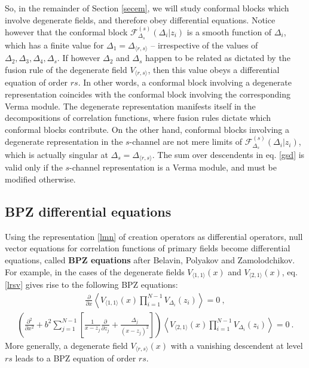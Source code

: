 \documentclass[12pt, a4paper, notitlepage, twoside]{report}
\numberwithin{equation}{section}
\theoremstyle{break}
\begin{document}
So, in the remainder of Section \ref{secem}, we will study conformal blocks which involve degenerate fields, and therefore obey differential equations. 
Notice however that the conformal block $\mathcal{F}^{(s)}_{\Delta_s}(\Delta_i|z_i)$ is a smooth function of $\Delta_i$, which has a finite value for $\Delta_1 = \Delta_{\langle r,s\rangle}$ -- irrespective of the values of $\Delta_2,\Delta_3,\Delta_4,\Delta_s$. 
If however $\Delta_2$ and $\Delta_s$ happen to be related as dictated by the fusion rule of the degenerate field $V_{\langle r,s\rangle}$, then this value obeys a differential equation of order $rs$.
In other words, a conformal block involving a degenerate representation coincides with the conformal block involving the corresponding Verma module.
The degenerate representation manifests itself in the decompositions of correlation functions, where fusion rules dictate which conformal blocks contribute.
On the other hand, conformal blocks involving a degenerate representation in the $s$-channel are not mere limits of $\mathcal{F}^{(s)}_{\Delta_s}(\Delta_i|z_i)$, which is actually singular at $\Delta_s = \Delta_{\langle r,s\rangle}$.
The sum over descendents in eq. \eqref{gsd} is valid only if the $s$-channel representation is a Verma module, and must be modified otherwise. 

\subsection{BPZ differential equations \label{secbpz}}

Using the representation \eqref{lmn} of creation operators as differential operators, null vector equations for correlation functions of primary fields become differential equations, called \textbf{\boldmath BPZ equations} after Belavin, Polyakov and Zamolodchikov. 
For example, in the cases of the degenerate fields $V_{\langle 1,1 \rangle}(x)$ and $V_{\langle 2,1 \rangle}(x)$, eq. \eqref{lrsv} gives rise to the following BPZ equations: 
\begin{align}
 {\frac{\partial}{\partial x}} \left\langle V_{\langle 1,1 \rangle}(x) \prod_{i=1}^{N-1} V_{\Delta_i}(z_i) \right\rangle = 0 \ ,
\label{pvoo} 
\end{align}
\begin{align}
\boxed{\left( \frac{\partial^2}{\partial x^2}  +b^2 \sum_{j=1}^{N-1} \left[\frac{1}{x-z_j}{\frac{\partial}{\partial z_j}}+ \frac{\Delta_j}{(x-z_j)^2} \right]\right)\left\langle V_{\langle 2,1 \rangle}(x) \prod_{i=1}^{N-1} V_{\Delta_i}(z_i) \right\rangle = 0} \ .
\label{pvot}
\end{align}
More generally, a degenerate field $V_{\langle r,s \rangle}(x)$ with a vanishing descendent at level $rs$ leads to a BPZ equation of order $rs$. 
\end{document}
